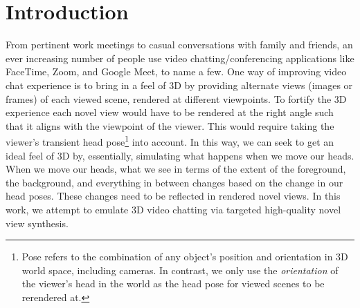\chapter{Introduction}\label{ch1:introduction}
 
From pertinent work meetings to casual conversations with family and friends, an ever increasing number of people use video chatting/conferencing applications like FaceTime, Zoom, and Google Meet, to name a few. One way of improving video chat experience is to bring in a feel of 3D by providing alternate views (images or frames) of each viewed scene, rendered at different viewpoints. To fortify the 3D experience each novel view would have to be rendered at the right angle such that it aligns with the viewpoint of the viewer. This would require taking the viewer's transient head pose\footnote{Pose refers to the combination of any object's position and orientation in 3D world space, including cameras. In contrast, we only use the \textit{orientation} of the viewer's head in the world as the head pose for viewed scenes to be rerendered at.} into account. In this way, we can seek to get an ideal feel of 3D by, essentially, simulating what happens when we move our heads. When we move our heads, what we see in terms of the extent of the foreground, the background, and everything in between changes based on the change in our head poses. These changes need to be reflected in rendered novel views. In this work, we attempt to emulate 3D video chatting via targeted high-quality novel view synthesis.


